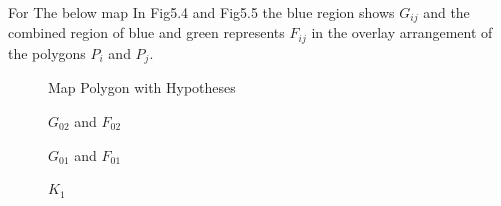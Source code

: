 For The below map
In Fig5.4 and Fig5.5 the blue region shows $G_{ij}$ and the combined region of blue and green represents $F_{ij}$ in the overlay
arrangement of the polygons $P_i$ and $P_j$.
\begin{figure}
\begin{center}
\caption{\label{fig:Construction}Map Polygon with Hypotheses}
\end{center}
\end{figure}

\begin{figure}
\begin{center}
\caption{\label{fig:Construction}$G_{02}$ and $F_{02}$}
\end{center}
\end{figure}

\begin{figure}
\begin{center}
\caption{\label{fig:Construction}$G_{01}$ and $F_{01}$}
\end{center}
\end{figure}

\begin{figure}
\begin{center}
\caption{\label{fig:Construction} $K_{1}$}
\end{center}
\end{figure}